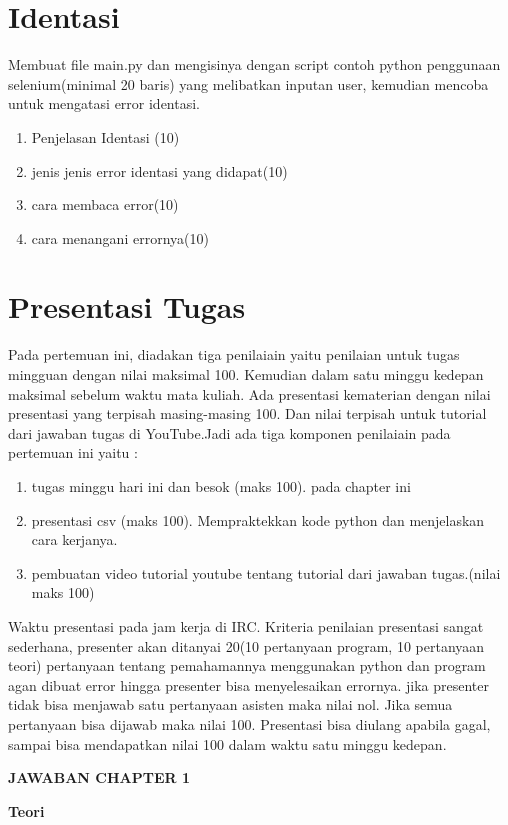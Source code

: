\section{Identasi}
Membuat file main.py dan mengisinya dengan script contoh python penggunaan selenium(minimal 20 baris) yang melibatkan inputan user, kemudian mencoba untuk mengatasi error identasi.
\begin{enumerate}
	\item
Penjelasan Identasi (10)
	\item
jenis jenis error identasi yang didapat(10)
\item
cara membaca error(10)
\item 
cara menangani errornya(10)
\end{enumerate}

\section{Presentasi Tugas}
Pada pertemuan ini, diadakan tiga penilaiain yaitu penilaian untuk tugas mingguan dengan nilai maksimal 100. Kemudian dalam satu minggu kedepan maksimal sebelum waktu mata kuliah. Ada presentasi kematerian dengan nilai presentasi yang terpisah masing-masing 100. Dan nilai terpisah untuk tutorial dari jawaban tugas di YouTube.Jadi ada tiga komponen penilaiain pada pertemuan ini yaitu :
\begin{enumerate}
	\item tugas minggu hari ini dan besok (maks 100). pada chapter ini
	\item presentasi csv (maks 100). Mempraktekkan kode python dan menjelaskan cara kerjanya.
	\item pembuatan video tutorial youtube tentang tutorial dari jawaban tugas.(nilai maks 100)
\end{enumerate}
Waktu presentasi pada jam kerja di IRC. Kriteria penilaian presentasi sangat sederhana, presenter akan ditanyai 20(10 pertanyaan program, 10 pertanyaan teori) pertanyaan tentang pemahamannya menggunakan python dan program agan dibuat error hingga presenter bisa menyelesaikan errornya. jika presenter tidak bisa menjawab satu pertanyaan asisten maka nilai nol. Jika semua pertanyaan bisa dijawab maka nilai 100. Presentasi bisa diulang apabila gagal, sampai bisa mendapatkan nilai 100 dalam waktu satu minggu kedepan.
\item \textbf{JAWABAN CHAPTER 1} 
\par
\textbf{Teori}
